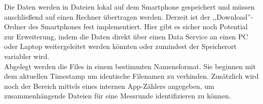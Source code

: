 Die Daten werden in Dateien lokal auf dem Smartphone gespeichert und müssen anschließend auf einen Rechner übertragen werden. Derzeit ist der ,,Download''-Ordner des Smartphones fest implementiert. Hier gibt es sicher noch Potential zur Erweiterung, indem die Daten direkt über einen Data Service an einen PC oder Laptop weitergeleitet werden könnten oder zumindest der Speicherort variabler wird. \\
Abgelegt werden die Files in einem bestimmten Namensformat. Sie beginnen mit dem aktuellen Timestamp um identische Filenamen zu verhinden. Zusätzlich wird noch der Bereich mittels eines internen App-Zählers angegeben, um zusammenhängende Dateien für eine Messrunde identifizieren zu können.